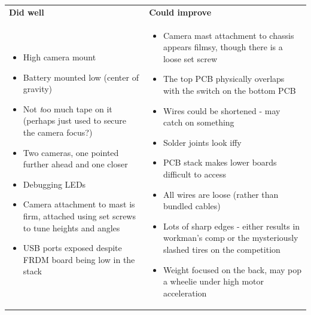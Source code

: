 \documentclass{article}
\begin{document}
\begin{tabularx}{\textwidth}{X X}
\textbf{Did well} & \textbf{Could improve} \\
\begin{itemize}
  \item High camera mount
  \item Battery mounted low (center of gravity)
  \item Not \textit too much tape on it (perhaps just used to secure the camera focus?)
  \item Two cameras, one pointed further ahead and one closer
  \item Debugging LEDs
  \item Camera attachment to mast is firm, attached using set screws to tune heights and angles
  \item USB ports exposed despite FRDM board being low in the stack
\end{itemize}
&
\begin{itemize}
  \item Camera mast attachment to chassis appears filmsy, though there is a loose set screw
  \item The top PCB physically overlaps with the switch on the bottom PCB
  \item Wires could be shortened - may catch on something
  \item Solder joints look iffy
  \item PCB stack makes lower boards difficult to access
  \item All wires are loose (rather than bundled cables)
  \item Lots of sharp edges - either results in workman's comp or the mysteriously slashed tires on the competition
  \item Weight focused on the back, may pop a wheelie under high motor acceleration
\end{itemize}
\end{tabularx}
\end{document}
